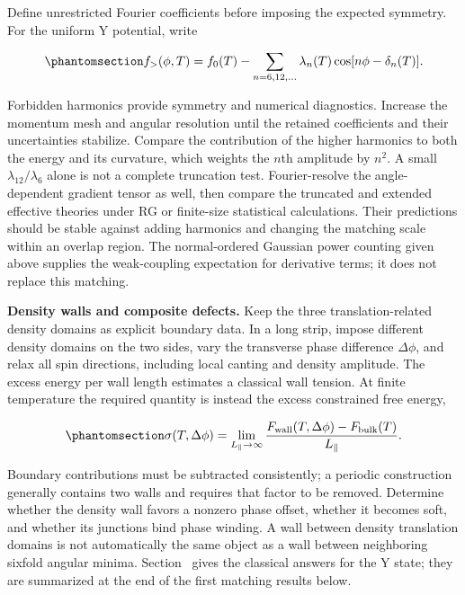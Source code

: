 Define unrestricted Fourier coefficients before imposing the expected
symmetry. For the uniform Y potential, write

\begin{equation}\phantomsection\label{eq-nbcp-matching-harmonics}{
f_>(\phi,T)=f_0(T)-\sum_{n=6,12,\ldots}
\lambda_n(T)\cos[n\phi-\delta_n(T)].
}\end{equation}

Forbidden harmonics provide symmetry and numerical diagnostics. Increase
the momentum mesh and angular resolution until the retained coefficients
and their uncertainties stabilize. Compare the contribution of the
higher harmonics to both the energy and its curvature, which weights the
\(n\)th amplitude by \(n^2\). A small \(\lambda_{12}/\lambda_6\) alone
is not a complete truncation test. Fourier-resolve the angle-dependent
gradient tensor as well, then compare the truncated and extended
effective theories under RG or finite-size statistical calculations.
Their predictions should be stable against adding harmonics and changing
the matching scale within an overlap region. The normal-ordered Gaussian
power counting given above supplies the weak-coupling expectation for
derivative terms; it does not replace this matching.

\textbf{Density walls and composite defects.} Keep the three
translation-related density domains as explicit boundary data. In a long
strip, impose different density domains on the two sides, vary the
transverse phase difference \(\Delta\phi\), and relax all spin
directions, including local canting and density amplitude. The excess
energy per wall length estimates a classical wall tension. At finite
temperature the required quantity is instead the excess constrained free
energy,

\begin{equation}\phantomsection\label{eq-nbcp-matching-wall-tension}{
\sigma(T,\Delta\phi)=\lim_{L_\parallel\to\infty}
\frac{F_{\rm wall}(T,\Delta\phi)-F_{\rm bulk}(T)}{L_\parallel}.
}\end{equation}

Boundary contributions must be subtracted consistently; a periodic
construction generally contains two walls and requires that factor to be
removed. Determine whether the density wall favors a nonzero phase
offset, whether it becomes soft, and whether its junctions bind phase
winding. A wall between density translation domains is not automatically
the same object as a wall between neighboring sixfold angular minima.
Section~ gives the classical answers for
the Y state; they are summarized at the end of the first matching
results below.


